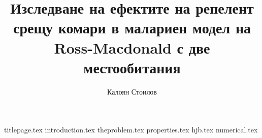 \documentclass[bulgarian, 12pt]{article}
\title{Изследване на ефектите на репелент срещу комари в малариен модел на Ross-Macdonald с две местообитания}
\author{Калоян Стоилов}
\begin{document}
{titlepage.tex}
\tableofcontents
\thispagestyle{empty}
\newpage
\setcounter{page}{1}
{introduction.tex}
{theproblem.tex}
{properties.tex}
{hjb.tex}
{numerical.tex}
\pagebreak
\printbibliography[heading=bibintoc]
\end{document}
